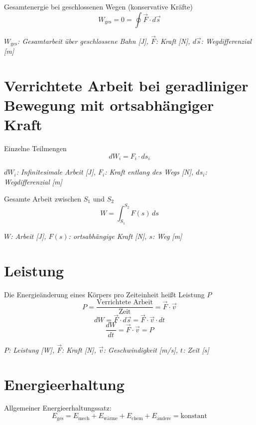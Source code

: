 \documentclass[a4paper,10pt]{article}
\newenvironment{displayformula}
{
	\begin{framed}
		\color{formulaColor}
	}
	{\end{framed}}
\newcommand{\formulalegend}[1]{%
	\par\vspace{0.5ex}%
	{{\color{legendColor}\RaggedRight\small\textit{#1}}}%
	\par\vspace{1.5ex}%
}
\begin{document}
\begin{displayformula}
	Gesamtenergie bei geschlossenen Wegen (konservative Kräfte)
	\[
	W_{\text{ges}} = 0 = \oint \vec{F} \cdot d\vec{s}
	\]
\end{displayformula}
\formulalegend{
	\( W_{\text{ges}} \): Gesamtarbeit über geschlossene Bahn [J], \( \vec{F} \): Kraft [N], \( d\vec{s} \): Wegdifferenzial [m]
}

\section{Verrichtete Arbeit bei geradliniger Bewegung mit ortsabhängiger Kraft}

\begin{displayformula}
	Einzelne Teilmengen
	\[
	dW_i = F_i \cdot ds_i
	\]
\end{displayformula}
\formulalegend{
	\( dW_i \): Infinitesimale Arbeit [J], \( F_i \): Kraft entlang des Wegs [N], \( ds_i \): Wegdifferenzial [m]
}

\begin{displayformula}
	Gesamte Arbeit zwischen \( S_1 \) und \( S_2 \)
	\[
	W = \int_{S_1}^{S_2} F(s) \, ds
	\]
\end{displayformula}
\formulalegend{
	\( W \): Arbeit [J], \( F(s) \): ortsabhängige Kraft [N], \( s \): Weg [m]
}


\section{Leistung}

\begin{displayformula}
	Die Energieänderung eines Körpers pro Zeiteinheit heißt Leistung \( P \)
	\[
	P = \frac{\text{Verrichtete Arbeit}}{\text{Zeit}} = \vec{F} \cdot \vec{v}
	\]
	\[
	dW = \vec{F} \cdot d \vec{s} = \vec{F} \cdot \vec{v} \cdot dt
	\]
	\[
	\frac{dW}{dt} = \vec{F} \cdot \vec{v} = P
	\]
\end{displayformula}
\formulalegend{
	\( P \): Leistung [W], \( \vec{F} \): Kraft [N], \( \vec{v} \): Geschwindigkeit [m/s], \( t \): Zeit [s]
}

\section{Energieerhaltung}

\begin{displayformula}
	Allgemeiner Energieerhaltungssatz: 
	\[
	E_{\text{ges}} = E_{\text{mech}} + E_{\text{wärme}} + E_{\text{chem}} + E_{\text{andere}} = \text{konstant}
	\]
\end{displayformula}
\end{document}
